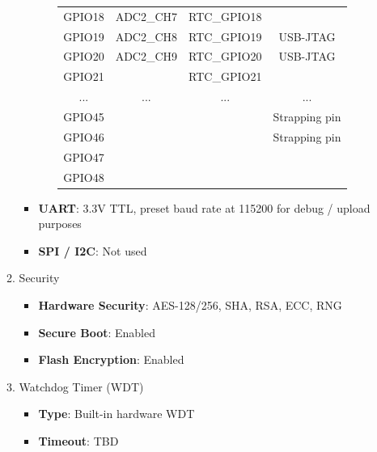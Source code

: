 \documentclass[conference]{IEEEtran}
\begin{document}
\begin{enumerate}[label=\arabic*.]
\begin{enumerate}[label=\alph*.]
\begin{itemize}
\begin{enumerate}[label=\roman*.]
\begin{table}[ht]
\begin{tabular}{|c|c|c|c|}
GPIO18 & ADC2\_CH7 & RTC\_GPIO18 &  \\
GPIO19 & ADC2\_CH8 & RTC\_GPIO19 & USB-JTAG \\
GPIO20 & ADC2\_CH9 & RTC\_GPIO20 & USB-JTAG \\
GPIO21 &  & RTC\_GPIO21 &  \\
... & ... & ... & ... \\
GPIO45 &  &  & Strapping pin \\
GPIO46 &  &  & Strapping pin \\
GPIO47 &  &  &  \\
GPIO48 &  &  &  \\
\hline
\end{tabular}
\end{table}

\end{enumerate}
\item \textbf{UART}: 3.3V TTL, preset baud rate at 115200 for debug / upload purposes \\
\item \textbf{SPI / I2C}: Not used\\
\end{itemize}

\item Security\\
\begin{itemize}
\item \textbf{Hardware Security}: AES-128/256, SHA, RSA, ECC, RNG\\
\item \textbf{Secure Boot}: Enabled\\
\item \textbf{Flash Encryption}: Enabled\\
\end{itemize}

\item Watchdog Timer (WDT)\\
\begin{itemize}
\item \textbf{Type}: Built-in hardware WDT\\
\item \textbf{Timeout}: TBD\\
\end{itemize}


\end{enumerate}
\end{enumerate}
\end{document}
